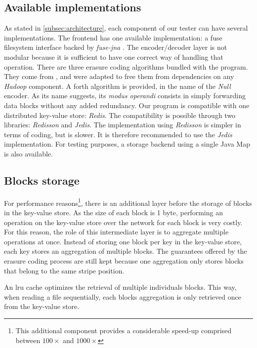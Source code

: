 \subsection{Available implementations}

As stated in \autoref{subsec:architecture}, each component of our tester can have several implementations.
The frontend has one available implementation: a \ac{fuse} filesystem interface backed by \textit{fuse-jna} \autocite{fuse-jna}.
The encoder/decoder layer is not modular because it is sufficient to have one correct way of handling that operation.
There are three erasure coding algorithms bundled with the program.
They come from \autocite{XorbasVLDB}, and were adapted to free them from dependencies on any \textit{Hadoop} component.
A forth algorithm is provided, in the name of the \textit{Null} encoder.
As its name suggests, its \textit{modus operandi} consists in simply forwarding data blocks without any added redundancy.
Our program is compatible with one distributed key-value store: \textit{Redis}.
The compatibility is possible through two libraries: \textit{Redisson} and \textit{Jedis}.
The implementation using \textit{Redisson} is simpler in terms of coding, but is slower.
It is therefore recommended to use the \textit{Jedis} implementation.
For testing purposes, a storage backend using a single Java Map is also available.

\subsection{Blocks storage}

For performance reasons\footnote{This additional component provides a considerable speed-up comprised between $100\times$ and $1000\times$}, there is an additional layer before the storage of blocks in the key-value store.
As the size of each block is 1 byte, performing an operation on the key-value store over the network for each block is very costly.
For this reason, the role of this intermediate layer is to aggregate multiple operations at once.
Instead of storing one block per key in the key-value store, each key stores an aggregation of multiple blocks.
The guarantees offered by the erasure coding process are still kept because one aggregation only stores blocks that belong to the same stripe position.

An \ac{lru} cache optimizes the retrieval of multiple individuals blocks.
This way, when reading a file sequentially, each blocks aggregation is only retrieved once from the key-value store.

